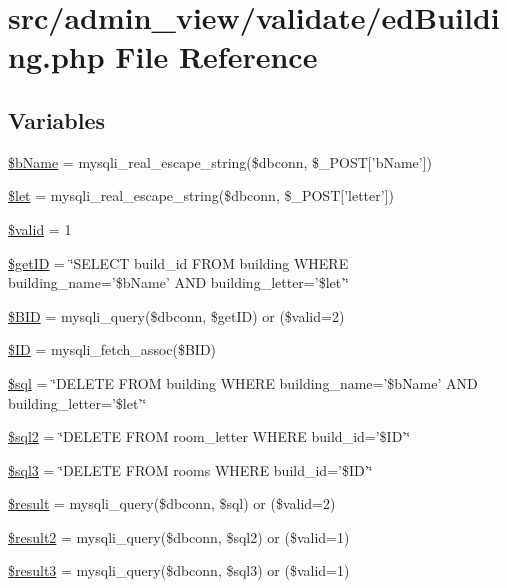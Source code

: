 \hypertarget{edBuilding_8php}{\section{src/admin\-\_\-view/validate/ed\-Building.php \-File \-Reference}
\label{edBuilding_8php}
}
\subsection*{\-Variables}
\begin{DoxyCompactItemize}
\item 
\hyperlink{edBuilding_8php_adda32c78f7f7aed9a0f7bb03a9198e9c}{\$b\-Name} = mysqli\-\_\-real\-\_\-escape\-\_\-string(\$dbconn, \$\-\_\-\-P\-O\-S\-T\mbox{[}'b\-Name'\mbox{]})
\item 
\hyperlink{edBuilding_8php_ac3687b5a21519c53f240b5d1c07f997a}{\$let} = mysqli\-\_\-real\-\_\-escape\-\_\-string(\$dbconn, \$\-\_\-\-P\-O\-S\-T\mbox{[}'letter'\mbox{]})
\item 
\hyperlink{edBuilding_8php_a0587674d27d00ef497e08e53ccf45bbb}{\$valid} = 1
\item 
\hyperlink{edBuilding_8php_aae30003a4d3fab7dc75a19cbfddea7a8}{\$get\-I\-D} = \char`\"{}\-S\-E\-L\-E\-C\-T build\-\_\-id \-F\-R\-O\-M building \-W\-H\-E\-R\-E building\-\_\-name='\$b\-Name' \-A\-N\-D building\-\_\-letter='\$let'\char`\"{}
\item 
\hyperlink{edBuilding_8php_a7458cf5c1cfaeb93fe055362ecff999e}{\$\-B\-I\-D} = mysqli\-\_\-query(\$dbconn, \$get\-I\-D) or (\$valid=2)
\item 
\hyperlink{edBuilding_8php_a68d2e459193313b71494801a69ade623}{\$\-I\-D} = mysqli\-\_\-fetch\-\_\-assoc(\$\-B\-I\-D)
\item 
\hyperlink{edBuilding_8php_a047170d6020a882807665812a27e2525}{\$sql} = \char`\"{}\-D\-E\-L\-E\-T\-E \-F\-R\-O\-M building \-W\-H\-E\-R\-E building\-\_\-name='\$b\-Name' \-A\-N\-D building\-\_\-letter='\$let'\char`\"{}
\item 
\hyperlink{edBuilding_8php_a1ad0ffe3fa0755e56a1a6bb40c232b8a}{\$sql2} = \char`\"{}\-D\-E\-L\-E\-T\-E \-F\-R\-O\-M room\-\_\-letter \-W\-H\-E\-R\-E build\-\_\-id='\$\-I\-D'\char`\"{}
\item 
\hyperlink{edBuilding_8php_af837618eb187a024f9473f6de320db84}{\$sql3} = \char`\"{}\-D\-E\-L\-E\-T\-E \-F\-R\-O\-M rooms \-W\-H\-E\-R\-E build\-\_\-id='\$\-I\-D'\char`\"{}
\item 
\hyperlink{edBuilding_8php_a112ef069ddc0454086e3d1e6d8d55d07}{\$result} = mysqli\-\_\-query(\$dbconn, \$sql) or (\$valid=2)
\item 
\hyperlink{edBuilding_8php_ae734ecc68847d4f436c60c39ec64af11}{\$result2} = mysqli\-\_\-query(\$dbconn, \$sql2) or (\$valid=1)
\item 
\hyperlink{edBuilding_8php_a3bed351c02cbc07bce580e0044c8d37d}{\$result3} = mysqli\-\_\-query(\$dbconn, \$sql3) or (\$valid=1)
\end{DoxyCompactItemize}


